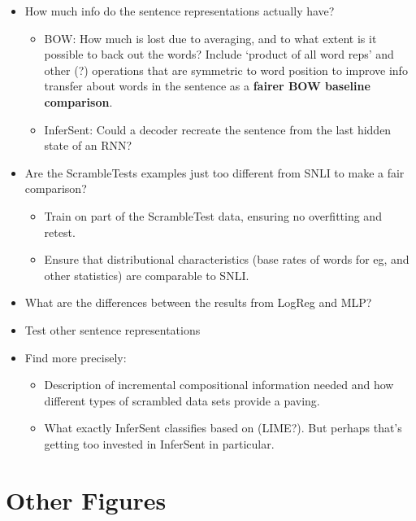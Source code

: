 \documentclass[10pt,letterpaper]{article}
\begin{document}
\begin{itemize}
\item How much info do the sentence representations actually have?
\begin{itemize}
\item BOW: How much is lost due to averaging, and to what extent is it possible to back out the words? Include `product of all word reps' and other (?) operations that are symmetric to word position to improve info transfer about words in the sentence as a \textbf{fairer BOW baseline comparison}.
\item InferSent: Could a decoder recreate the sentence from the last hidden state of an RNN? 
\end{itemize}
\item Are the ScrambleTests examples just too different from SNLI to make a fair comparison?
\begin{itemize}
\item Train on part of the ScrambleTest data, ensuring no overfitting and retest.
\item Ensure that distributional characteristics (base rates of words for eg, and other statistics) are comparable to SNLI.
\end{itemize}
\item What are the differences between the results from LogReg and MLP?
\item Test other sentence representations 
\item Find more precisely:
\begin{itemize}
\item Description of incremental compositional information needed and how different types of scrambled data sets provide a paving.
\item What exactly InferSent classifies based on (LIME?). But perhaps that's getting too invested in InferSent in particular.
\end{itemize} 
\end{itemize}




\newpage
\section*{Other Figures}
\end{document}
